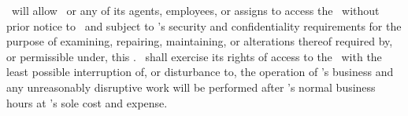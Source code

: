 \lessee\ will allow \lessor\ or any of its agents, employees, or assigns to access the \property\ without prior notice to \lessee\ and subject to \lessee’s security and confidentiality requirements for the purpose of examining, repairing, maintaining, or alterations thereof required by, or permissible under, this \amendmentTitle. \lessor\ shall exercise its rights of access to the \property\ with the least possible interruption of, or disturbance to, the operation of \lessee’s business and any unreasonably disruptive work will be performed after \lessee’s normal business hours at \lessor’s sole cost and expense.
